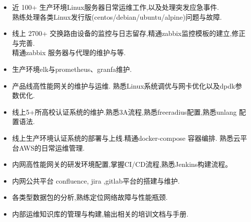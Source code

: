 \documentclass[zh]{resume}
\begin{document}
\begin{itemize}
  \item 近 100+ 生产环境Linux服务器日常运维工作,以及处理突发应急事件.\\ 熟练处理各类Linux发行版(centos/debian/ubuntu/alpine)问题与故障. 
  \item 线上 2700+ 交换路由设备的监控与日志留存,精通zabbix监控模板的建立,修正与完善.\\精通zabbix 服务器与代理的维护与等.
  \item 生产环境elk与prometheus、granfa维护. 
  \item 产品线高性能网关的维护与运维. 熟悉Linux系统调优与网卡优化以及dpdk参数优化.
  \item 线上5+所高校认证系统的维护.熟悉3A流程,熟悉freeradius配置,熟悉unlang 配置语法.
  \item 线上生产环境认证系统的部署与上线.精通docker-compose 容器编排. 熟悉云平台AWS的日常运维管理. 
  \item 内网高性能网关的研发环境配置,掌握CI/CD流程,熟悉Jenkins构建流程。
  \item 内网公共平台 confluence, jira ,gitlab平台的搭建与维护.
  \item 各类型数据包的分析,熟练定位网络故障与性能瓶颈.
  \item 内部运维知识库的管理与构建,输出相关的培训文档与手册.
\end{itemize}
\end{document}

